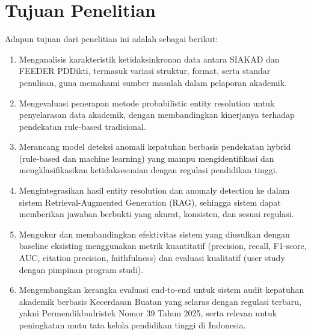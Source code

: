 \documentclass[12pt,a4paper,oneside]{report}
\begin{document}
        \section{Tujuan Penelitian}
            Adapun tujuan dari penelitian ini adalah sebagai berikut:
            \begin{enumerate}
                \item Menganalisis karakteristik ketidaksinkronan data antara SIAKAD dan FEEDER PDDikti, termasuk variasi struktur, format, serta standar penulisan, guna memahami sumber masalah dalam pelaporan akademik.
                \item Mengevaluasi penerapan metode probabilistic entity resolution untuk penyelarasan data akademik, dengan membandingkan kinerjanya terhadap pendekatan rule-based tradisional.
                \item Merancang model deteksi anomali kepatuhan berbasis pendekatan hybrid (rule-based dan machine learning) yang mampu mengidentifikasi dan mengklasifikasikan ketidaksesuaian dengan regulasi pendidikan tinggi.
                \item Mengintegrasikan hasil entity resolution dan anomaly detection ke dalam sistem Retrieval-Augmented Generation (RAG), sehingga sistem dapat memberikan jawaban berbukti yang akurat, konsisten, dan sesuai regulasi.
                \item Mengukur dan membandingkan efektivitas sistem yang diusulkan dengan baseline eksisting menggunakan metrik kuantitatif (precision, recall, F1-score, AUC, citation precision, faithfulness) dan evaluasi kualitatif (user study dengan pimpinan program studi).
                \item Mengembangkan kerangka evaluasi end-to-end untuk sistem audit kepatuhan akademik berbasis Kecerdasan Buatan yang selaras dengan regulasi terbaru, yakni Permendikbudristek Nomor 39 Tahun 2025, serta relevan untuk peningkatan mutu tata kelola pendidikan tinggi di Indonesia.
            \end{enumerate}
\end{document}
